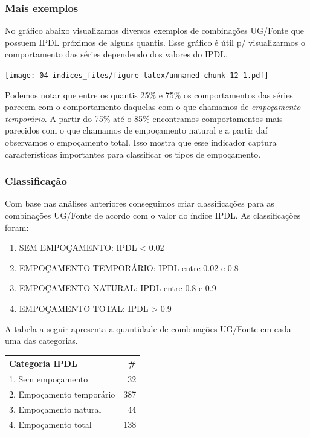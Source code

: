 \documentclass[
]{book}
\providecommand{\tightlist}{%
  \setlength{\itemsep}{0pt}\setlength{\parskip}{0pt}}
\begin{document}
\hypertarget{mais-exemplos-1}{%
\subsubsection{Mais exemplos}\label{mais-exemplos-1}}

No gráfico abaixo visualizamos diversos exemplos de combinações UG/Fonte que possuem IPDL próximos de alguns quantis. Esse gráfico é útil p/ visualizarmos o comportamento das séries dependendo dos valores do IPDL.

\texttt{[image: 04-indices\_files/figure-latex/unnamed-chunk-12-1.pdf]}

Podemos notar que entre os quantis 25\% e 75\% os comportamentos das séries parecem com o comportamento daquelas com o que chamamos de \emph{empoçamento temporário}. A partir do 75\% até o 85\% encontramos comportamentos mais parecidos com o que chamamos de empoçamento natural e a partir daí observamos o empoçamento total. Isso mostra que esse indicador captura características importantes para classificar os tipos de empoçamento.

\hypertarget{classificauxe7uxe3o-1}{%
\subsubsection{Classificação}\label{classificauxe7uxe3o-1}}

Com base nas análises anteriores conseguimos criar classificações para as combinações UG/Fonte de acordo com o valor do índice IPDL. As classificações foram:

\begin{enumerate}
\def\labelenumi{\arabic{enumi}.}
\tightlist
\item
  SEM EMPOÇAMENTO: IPDL \textless{} 0.02
\item
  EMPOÇAMENTO TEMPORÁRIO: IPDL entre 0.02 e 0.8
\item
  EMPOÇAMENTO NATURAL: IPDL entre 0.8 e 0.9
\item
  EMPOÇAMENTO TOTAL: IPDL \textgreater{} 0.9
\end{enumerate}

A tabela a seguir apresenta a quantidade de combinações UG/Fonte em cada uma das categorias.

\begin{tabular}{l|r}
\hline
Categoria IPDL & \#\\
\hline
1. Sem empoçamento & 32\\
\hline
2. Empoçamento temporário & 387\\
\hline
3. Empoçamento natural & 44\\
\hline
4. Empoçamento total & 138\\
\hline
\end{tabular}
\end{document}
